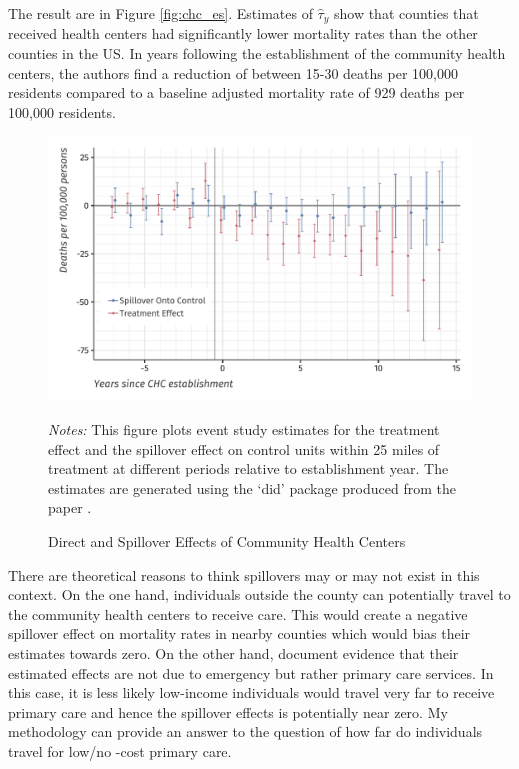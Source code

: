 \documentclass[11pt]{article}
\begin{document}
The result are in Figure \ref{fig:chc_es}. Estimates of $\hat{\tau}_y$ show that counties that received health centers had significantly lower mortality rates than the other counties in the US. In years following the establishment of the community health centers, the authors find a reduction of between 15-30 deaths per 100,000 residents compared to a baseline adjusted mortality rate of 929 deaths per 100,000 residents. 

\begin{figure}[tb!]
    \caption{Direct and Spillover Effects of Community Health Centers}
    \label{fig:chc_es_spill}
        
        {\centering
            \includegraphics[width=\textwidth]{../../figures/figure-chc-es_combined.pdf}
        }

    {\footnotesize
        \textit{Notes:} This figure plots event study estimates for the treatment effect and the spillover effect on control units within 25 miles of treatment at different periods relative to establishment year. The estimates are generated using the `did' package produced from the paper \citet{Callaway_SantAnna_2020}. 
    }
\end{figure}

There are theoretical reasons to think spillovers may or may not exist in this context. On the one hand, individuals outside the county can potentially travel to the community health centers to receive care. This would create a negative spillover effect on mortality rates in nearby counties which would bias their estimates towards zero. On the other hand, \citet{Bailey_Goodman_Bacon_2015} document evidence that their estimated effects are not due to emergency but rather primary care services. In this case, it is less likely low-income individuals would travel very far to receive primary care and hence the spillover effects is potentially near zero. My methodology can provide an answer to the question of how far do individuals travel for low/no -cost primary care.
\end{document}
